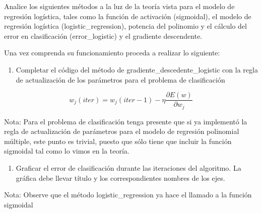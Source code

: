 \documentclass[11pt]{article}
\providecommand{\tightlist}{%
      \setlength{\itemsep}{0pt}\setlength{\parskip}{0pt}}
\begin{document}
Analice los siguientes métodos a la luz de la teoría vista para el
modelo de regresión logística, tales como la función de activación
(sigmoidal), el modelo de regresión logística (logistic\_regression),
potencia del polinomio y el cálculo del error en clasificación
(error\_logistic) y el gradiente descendente.

Una vez comprenda su funcionamiento proceda a realizar lo siguiente:

\begin{enumerate}
\def\labelenumi{\arabic{enumi}.}
\tightlist
\item
  Completar el código del método de gradiente\_descedente\_logistic con
  la regla de actualización de los parámetros para el problema de
  clasificación
\end{enumerate}

\[w_j(iter) = w_j(iter-1) - \eta \frac{\partial E(w)}{\partial w_j}\]

Nota: Para el problema de clasificación tenga presente que si ya
implementó la regla de actualización de parámetros para el modelo de
regresión polinomial múltiple, este punto es trivial, puesto que sólo
tiene que incluir la función sigmoidal tal como lo vimos en la teoría.

\begin{enumerate}
\def\labelenumi{\arabic{enumi}.}
\setcounter{enumi}{1}
\tightlist
\item
  Graficar el error de clasificación durante las iteraciones del
  algoritmo. La gráfica debe llevar título y los correspondientes
  nombres de los ejes.
\end{enumerate}

Nota: Observe que el método logistic\_regression ya hace el llamado a la
función sigmoidal
\end{document}
